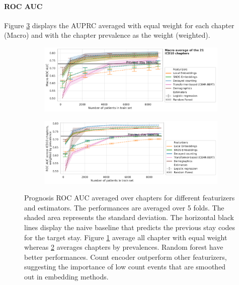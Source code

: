 \documentclass[french,12pt,twoside,a4paper]{book}
\begin{document}
\begin{appendices}
  \paragraph{ROC AUC}

  Figure \ref{fig:prognosis_rocauc} displays the AUPRC averaged with equal weight for each chapter (Macro)
  and with the chapter prevalence as the weight (weighted).


  \begin{figure}[!h]
    \centering
    \begin{subfigure}[b]{1\textwidth}
      \caption{}\label{fig:prognosis_rocauc_macro}
      \includegraphics[width=\linewidth]{img/chapter_3/prognosis/roc_auc_score__c_macro.pdf}
    \end{subfigure}
    \vfill
    \begin{subfigure}[b]{1\textwidth}
      \caption{}\label{fig:prognosis_rocauc_weighted}
      \includegraphics[width=\linewidth]{img/chapter_3/prognosis/roc_auc_score__c_weighted.pdf}
    \end{subfigure}
    \caption{Prognosis ROC AUC averaged over chapters for different featurizers and
      estimators. The performances are averaged over 5 folds. The shaded area
      represents the standard deviation. The horizontal black lines display the
      naive baseline that predicts the previous stay codes for the target stay.
      Figure \ref{fig:prognosis_rocauc_macro} average all chapter with equal weight
      whereas \ref{fig:prognosis_rocauc_weighted} averages chapters by prevalences.
      Random forest have better performances. Count encoder outperform other
      featurizers, suggesting the importance of low count events that are smoothed
      out in embedding methods.}%
    \label{fig:prognosis_rocauc}
  \end{figure}


\end{appendices}
\end{document}
